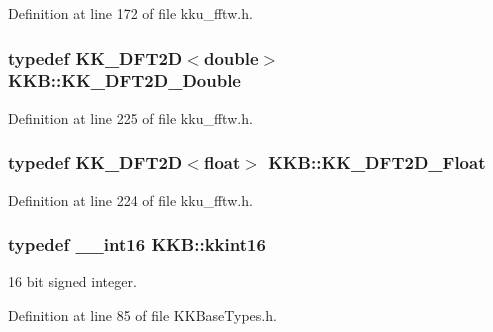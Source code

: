Definition at line 172 of file kku\+\_\+fftw.\+h.

\subsubsection[{\texorpdfstring{K\+K\+\_\+\+D\+F\+T2\+D\+\_\+\+Double}{KK_DFT2D_Double}}]{\setlength{\rightskip}{0pt plus 5cm}typedef {\bf K\+K\+\_\+\+D\+F\+T2D}$<$double$>$ {\bf K\+K\+B\+::\+K\+K\+\_\+\+D\+F\+T2\+D\+\_\+\+Double}}\hypertarget{namespace_k_k_b_adb0ab9433c6a13b95921ed75ce88e69f}{}\label{namespace_k_k_b_adb0ab9433c6a13b95921ed75ce88e69f}


Definition at line 225 of file kku\+\_\+fftw.\+h.

\subsubsection[{\texorpdfstring{K\+K\+\_\+\+D\+F\+T2\+D\+\_\+\+Float}{KK_DFT2D_Float}}]{\setlength{\rightskip}{0pt plus 5cm}typedef {\bf K\+K\+\_\+\+D\+F\+T2D}$<$float$>$ {\bf K\+K\+B\+::\+K\+K\+\_\+\+D\+F\+T2\+D\+\_\+\+Float}}\hypertarget{namespace_k_k_b_a7de386112eca309c8ef4daddd5b64c8b}{}\label{namespace_k_k_b_a7de386112eca309c8ef4daddd5b64c8b}


Definition at line 224 of file kku\+\_\+fftw.\+h.

\subsubsection[{\texorpdfstring{kkint16}{kkint16}}]{\setlength{\rightskip}{0pt plus 5cm}typedef \+\_\+\+\_\+int16 {\bf K\+K\+B\+::kkint16}}\hypertarget{namespace_k_k_b_a93809780ee294124dda4c23069f41248}{}\label{namespace_k_k_b_a93809780ee294124dda4c23069f41248}


16 bit signed integer. 



Definition at line 85 of file K\+K\+Base\+Types.\+h.

